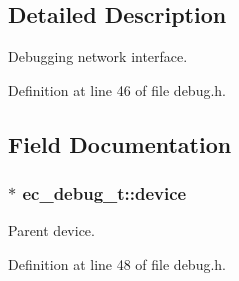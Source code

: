 \subsection{Detailed Description}
Debugging network interface. 

Definition at line 46 of file debug.\-h.



\subsection{Field Documentation}
\subsubsection[{device}]{$\ast$ ec\-\_\-debug\-\_\-t\-::device}\label{structec__debug__t_ab18ba1d3de75e73ab1d89315240b615d}


Parent device. 



Definition at line 48 of file debug.\-h.

